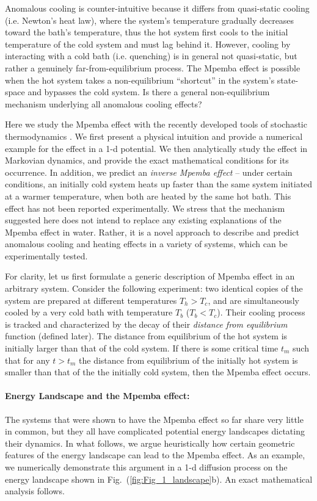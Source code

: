 \documentclass[a4paper,draft,aps,prl,preprint,superscriptaddress,nofootinbib]{revtex4}
\begin{document}
		Anomalous cooling is counter-intuitive because it differs from quasi-static cooling (i.e. Newton's heat law), where the system's temperature gradually decreases toward the bath's temperature, thus the hot system first cools to the initial temperature of the cold system and must lag behind it. However, cooling by interacting with a cold bath (i.e. quenching) is in general not quasi-static, but rather a genuinely far-from-equilibrium process. The Mpemba effect is possible when the hot system takes a non-equilibrium ``shortcut'' in the system's state-space and bypasses the cold system. Is there a general non-equilibrium mechanism underlying all anomalous cooling effects?


		Here we study the Mpemba effect with the recently developed tools of stochastic thermodynamics \cite{seifert_review_2012}. We first present a  physical intuition and  provide a numerical example for the effect in a 1-d potential. 
		We then analytically study the effect in Markovian dynamics, and provide the exact mathematical conditions for its occurrence. In addition, we predict an {\it inverse Mpemba effect} -- under certain conditions, an initially cold system heats up faster than the same system initiated at a warmer temperature, when both are heated by the same hot bath. This effect has not been reported experimentally.
		We stress that the mechanism suggested here does not intend to replace any existing explanations of the Mpemba effect in water. Rather, it is a novel approach to describe and predict anomalous cooling and heating effects in a variety of systems, which can be experimentally tested.   
		
				
		For clarity, let us first formulate a generic description of Mpemba effect in an arbitrary system. Consider the following experiment: two identical copies of the system are prepared at different temperatures $T_h>T_c$, and are simultaneously cooled by a very cold bath with temperature $T_b$ ($T_b<T_c$). Their cooling process is tracked and characterized by the decay of their {\it distance from equilibrium} function (defined later). The distance from equilibrium of the hot system is initially larger than that of the cold system. If there is some critical time $t_m$ such that for any $t>t_m$ the distance from equilibrium of the initially hot system is smaller than that of the the initially cold system, then the Mpemba effect occurs. 
		
		\paragraph{Energy Landscape and the Mpemba effect:}
		The systems that were shown to have the Mpemba effect so far share very little in common, but they all have complicated potential energy landscapes dictating their dynamics. In what follows, we argue heuristically how certain geometric features of the energy landscape can lead to the Mpemba effect. As an example, we numerically demonstrate this argument in a 1-d diffusion process on the energy landscape shown in Fig.~(\ref{fig:Fig_1_landscape}b). An exact mathematical analysis follows. 
   
\end{document}
